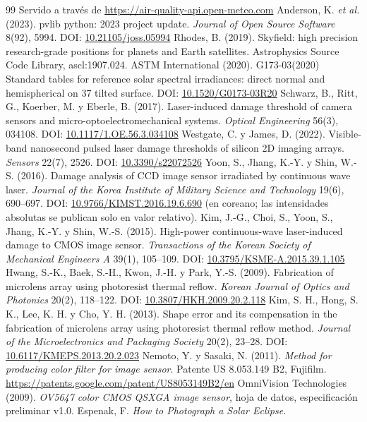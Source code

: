 \documentclass[10pt,a4paper]{article}
\newcommand{\doi}[1]{DOI: \href{https://doi.org/#1}{#1}}
\begin{document}
\begin{thebibliography}{99}
Servido a través de \url{https://air-quality-api.open-meteo.com}
 Anderson, K. \emph{et al.} (2023). pvlib python: 2023 project
update. \emph{Journal of Open Source Software} 8(92), 5994.
\doi{10.21105/joss.05994}
 Rhodes, B. (2019). Skyfield: high precision research-grade
positions for planets and Earth satellites. Astrophysics Source Code Library,
ascl:1907.024.
 ASTM International (2020). G173-03(2020) Standard tables for
reference solar spectral irradiances: direct normal and hemispherical on
37\textdegree{} tilted surface. \doi{10.1520/G0173-03R20}
 Schwarz, B., Ritt, G., Koerber, M. y Eberle, B. (2017).
Laser-induced damage threshold of camera sensors and micro-optoelectromechanical
systems. \emph{Optical Engineering} 56(3), 034108. \doi{10.1117/1.OE.56.3.034108}
 Westgate, C. y James, D. (2022). Visible-band nanosecond
pulsed laser damage thresholds of silicon 2D imaging arrays. \emph{Sensors}
22(7), 2526. \doi{10.3390/s22072526}
 Yoon, S., Jhang, K.-Y. y Shin, W.-S. (2016). Damage analysis
of CCD image sensor irradiated by continuous wave laser. \emph{Journal of the
Korea Institute of Military Science and Technology} 19(6), 690--697.
\doi{10.9766/KIMST.2016.19.6.690} (en coreano; las intensidades absolutas se
publican solo en valor relativo).
 Kim, J.-G., Choi, S., Yoon, S., Jhang, K.-Y. y Shin, W.-S.
(2015). High-power continuous-wave laser-induced damage to CMOS image sensor.
\emph{Transactions of the Korean Society of Mechanical Engineers A} 39(1),
105--109. \doi{10.3795/KSME-A.2015.39.1.105}
 Hwang, S.-K., Baek, S.-H., Kwon, J.-H. y Park, Y.-S. (2009).
Fabrication of microlens array using photoresist thermal reflow. \emph{Korean
Journal of Optics and Photonics} 20(2), 118--122. \doi{10.3807/HKH.2009.20.2.118}
 Kim, S. H., Hong, S. K., Lee, K. H. y Cho, Y. H. (2013). Shape
error and its compensation in the fabrication of microlens array using
photoresist thermal reflow method. \emph{Journal of the Microelectronics and
Packaging Society} 20(2), 23--28. \doi{10.6117/KMEPS.2013.20.2.023}
 Nemoto, Y. y Sasaki, N. (2011). \emph{Method for producing
color filter for image sensor}. Patente US 8.053.149 B2, Fujifilm.
\url{https://patents.google.com/patent/US8053149B2/en}
 OmniVision Technologies (2009). \emph{OV5647 color CMOS QSXGA
image sensor}, hoja de datos, especificación preliminar v1.0.
 Espenak, F. \emph{How to Photograph a Solar Eclipse}.

\end{thebibliography}
\end{document}
